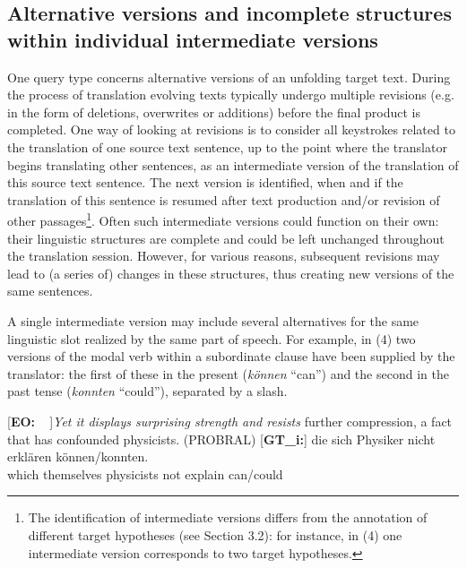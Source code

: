 \documentclass[output=paper]{LSP/langsci}
\begin{document}
\subsection{Alternative versions and incomplete structures within individual intermediate versions}
One query type concerns alternative versions of an unfolding target text. During the process of translation evolving texts typically undergo multiple revisions (e.g. in the form of deletions, overwrites or additions) before the final product is completed. One way of looking at revisions is to consider all keystrokes related to the translation of one source text sentence, up to the point where the translator begins translating other sentences, as an intermediate version of the translation of this source text sentence. The next version is identified, when and if the translation of this sentence is resumed after text production and/or revision of other passages\footnote{The identification of intermediate versions differs from the annotation of different target hypotheses (see Section 3.2): for instance, in (4) one intermediate version corresponds to two target hypotheses.}. Often such intermediate versions could function on their own: their linguistic structures are complete and could be left unchanged throughout the translation session. However, for various reasons, subsequent revisions may lead to (a series of) changes in these structures, thus creating new versions of the same sentences.

A single intermediate version may include several alternatives for the same linguistic slot realized by the same part of speech. For example, in (4) two versions of the modal verb within a subordinate clause have been supplied by the translator: the first of these in the present (\textit{können} “can”) and the second in the past tense (\textit{konnten} “could”), separated by a slash.


\ea
\begin{xlist}
\exi{}[\textbf{EO:~~}]{\emph{Yet it displays surprising strength and resists} further compression, a fact that has confounded physicists. (PROBRAL)}
\exi{}[\textbf{GT\_i:}]{
\gll  [{\dots}] die\raute{} sich\raute{} Physiker\raute{} nicht\raute{} erklären\raute{} können\stern{}/konnten.\\
{}  which themselves physicists not explain can/could\\
}
\end{xlist}
\z
\end{document}
